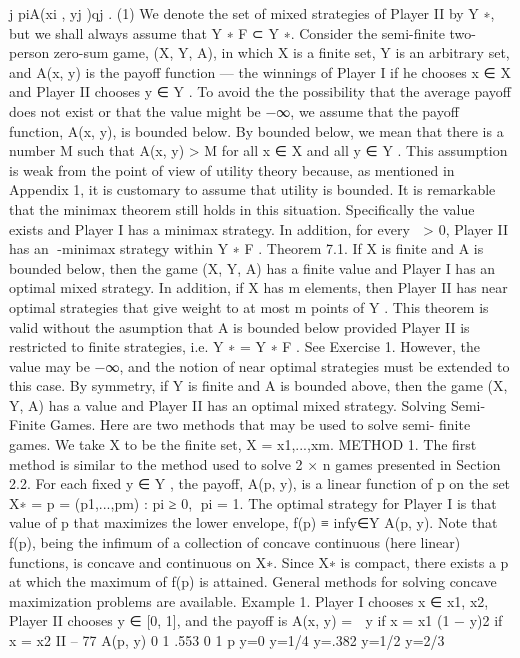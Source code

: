 j
piA(xi , yj )qj . (1)
We denote the set of mixed strategies of Player II by Y ∗, but we shall always assume that
Y ∗
F ⊂ Y ∗.
Consider the semi-finite two-person zero-sum game, (X, Y, A), in which X is a finite
set, Y is an arbitrary set, and A(x, y) is the payoff function — the winnings of Player I
if he chooses x ∈ X and Player II chooses y ∈ Y . To avoid the the possibility that the
average payoff does not exist or that the value might be −∞, we assume that the payoff
function, A(x, y), is bounded below. By bounded below, we mean that there is a number
M such that A(x, y) > M for all x ∈ X and all y ∈ Y . This assumption is weak from
the point of view of utility theory because, as mentioned in Appendix 1, it is customary
to assume that utility is bounded.
It is remarkable that the minimax theorem still holds in this situation. Specifically
the value exists and Player I has a minimax strategy. In addition, for every  > 0, Player
II has an -minimax strategy within Y ∗
F .
Theorem 7.1. If X is finite and A is bounded below, then the game (X, Y, A) has a finite
value and Player I has an optimal mixed strategy. In addition, if X has m elements, then
Player II has near optimal strategies that give weight to at most m points of Y .
This theorem is valid without the asumption that A is bounded below provided Player
II is restricted to finite strategies, i.e. Y ∗ = Y ∗
F . See Exercise 1. However, the value may
be −∞, and the notion of near optimal strategies must be extended to this case.
By symmetry, if Y is finite and A is bounded above, then the game (X, Y, A) has a
value and Player II has an optimal mixed strategy.
Solving Semi-Finite Games. Here are two methods that may be used to solve semi-
finite games. We take X to be the finite set, X = {x1,...,xm}.
METHOD 1. The first method is similar to the method used to solve 2 × n games
presented in Section 2.2. For each fixed y ∈ Y , the payoff, A(p, y), is a linear function of p
on the set X∗ = {p = (p1,...,pm) : pi ≥ 0,
pi = 1}. The optimal strategy for Player I is
that value of p that maximizes the lower envelope, f(p) ≡ infy∈Y A(p, y). Note that f(p),
being the infimum of a collection of concave continuous (here linear) functions, is concave
and continuous on X∗. Since X∗ is compact, there exists a p at which the maximum of f(p)
is attained. General methods for solving concave maximization problems are available.
Example 1. Player I chooses x ∈ {x1, x2}, Player II chooses y ∈ [0, 1], and the payoff
is
A(x, y) =  y if x = x1
(1 − y)2 if x = x2
II – 77
A(p, y)
0 1 .553
0
1
p
y=0
y=1/4
y=.382
y=1/2
y=2/3
